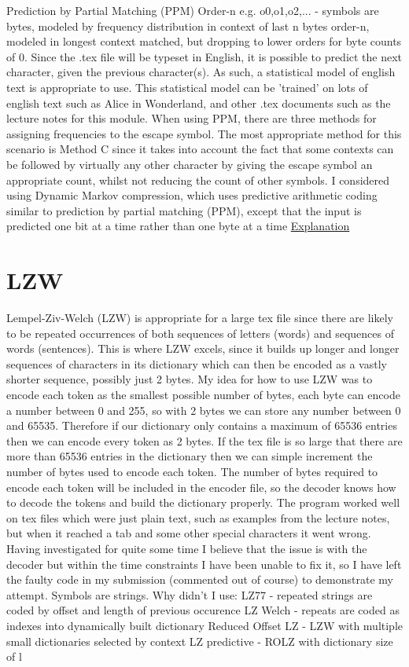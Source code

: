 \documentclass[a4paper, 11pt]{article}
\numberwithin{equation}{section}
\theoremstyle{plain}
\theoremstyle{definition}
\begin{document}
Prediction by Partial Matching (PPM)
Order-n e.g. o0,o1,o2,... - symbols are bytes, modeled by frequency distribution in context of last n bytes
order-n, modeled in longest context matched, but dropping to lower orders for byte counts of 0.
Since the .tex file will be typeset in English, it is possible to predict the next character, 
given the previous character(s). As such, a statistical model of english text is appropriate to use. 
This statistical model can be 'trained' on lots of english text such as Alice in Wonderland, 
and other .tex documents such as the lecture notes for this module. 
When using PPM, there are three methods for assigning frequencies to the escape symbol. 
The most appropriate method for this scenario is Method C since it takes into account the fact that 
some contexts can be followed by virtually any other character by giving the escape symbol 
an appropriate count, whilst not reducing the count of other symbols.
I considered using Dynamic Markov compression, which uses predictive arithmetic coding similar to prediction by partial matching (PPM), 
except that the input is predicted one bit at a time rather than one byte at a time
\href{https://mattmahoney.net/dc/dce.html#Section_422}{Explanation}

\section{LZW}

Lempel-Ziv-Welch (LZW) is appropriate for a large tex file since there are likely to be repeated occurrences 
of both sequences of letters (words) and sequences of words (sentences). 
This is where LZW excels, since it builds up longer and longer sequences of characters in its dictionary 
which can then be encoded as a vastly shorter sequence, possibly just 2 bytes. 
My idea for how to use LZW was to encode each token as the smallest possible number of bytes, 
each byte can encode a number between 0 and 255, so with 2 bytes we can store any number between 
0 and 65535. 
Therefore if our dictionary only contains a maximum of 65536 entries then we can encode every token as 
2 bytes. 
If the tex file is so large that there are more than 65536 entries in the dictionary then we can simple 
increment the number of bytes used to encode each token. 
The number of bytes required to encode each token will be included in the encoder file, so the decoder 
knows how to decode the tokens and build the dictionary properly. 
The program worked well on tex files which were just plain text, such as examples from the lecture notes, 
but when it reached a tab and some other special characters it went wrong. 
Having investigated for quite some time I believe that the issue is with the decoder but within the 
time constraints I have been unable to fix it, so I have left the faulty code in my submission 
(commented out of course) to demonstrate my attempt. 
Symbols are strings.
Why didn't I use:
LZ77 - repeated strings are coded by offset and length of previous occurence
LZ Welch - repeats are coded as indexes into dynamically built dictionary
Reduced Offset LZ - LZW with multiple small dictionaries selected by context
LZ predictive - ROLZ with dictionary size of l
\end{document}
